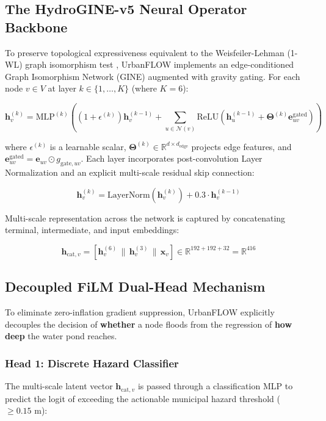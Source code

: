 \documentclass[conference]{IEEEtran}
\begin{document}
\subsection{The HydroGINE-v5 Neural Operator Backbone}
To preserve topological expressiveness equivalent to the Weisfeiler-Lehman (1-WL) graph isomorphism test \cite{xu2019}, UrbanFLOW implements an edge-conditioned Graph Isomorphism Network (GINE) augmented with gravity gating. For each node $v \in V$ at layer $k \in \{1, \dots, K\}$ (where $K = 6$):

\begin{equation}
\mathbf{h}_v^{(k)} = \text{MLP}^{(k)}\left( (1 + \epsilon^{(k)})\mathbf{h}_v^{(k-1)} + \sum_{u \in \mathcal{N}(v)} \text{ReLU}\left( \mathbf{h}_u^{(k-1)} + \mathbf{\Theta}^{(k)} \mathbf{e}_{uv}^{\text{gated}} \right) \right)
\end{equation}

where $\epsilon^{(k)}$ is a learnable scalar, $\mathbf{\Theta}^{(k)} \in \mathbb{R}^{d \times d_{\text{edge}}}$ projects edge features, and $\mathbf{e}_{uv}^{\text{gated}} = \mathbf{e}_{uv} \odot g_{\text{gate}, uv}$. Each layer incorporates post-convolution Layer Normalization and an explicit multi-scale residual skip connection:

\begin{equation}
\mathbf{h}_v^{(k)} = \text{LayerNorm}\left(\mathbf{h}_v^{(k)}\right) + 0.3 \cdot \mathbf{h}_v^{(k-1)}
\end{equation}

Multi-scale representation across the network is captured by concatenating terminal, intermediate, and input embeddings:

\begin{equation}
\mathbf{h}_{\text{cat}, v} = \left[ \mathbf{h}_v^{(6)} \,\|\, \mathbf{h}_v^{(3)} \,\|\, \mathbf{x}_v \right] \in \mathbb{R}^{192 + 192 + 32} = \mathbb{R}^{416}
\end{equation}

\subsection{Decoupled FiLM Dual-Head Mechanism}
To eliminate zero-inflation gradient suppression, UrbanFLOW explicitly decouples the decision of \textbf{whether} a node floods from the regression of \textbf{how deep} the water pond reaches.

\subsubsection{Head 1: Discrete Hazard Classifier}
The multi-scale latent vector $\mathbf{h}_{\text{cat}, v}$ is passed through a classification MLP to predict the logit of exceeding the actionable municipal hazard threshold ($\ge 0.15\text{ m}$):
\end{document}
